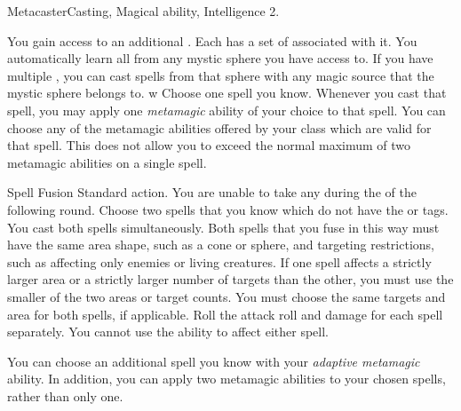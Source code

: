   \begin{magicalfeat}{Metacaster}{Casting, Magical}
    \featpre {} ability, Intelligence 2.

     You gain access to an additional .
    Each  has a set of  associated with it.
    You automatically learn all  from any mystic sphere you have access to.
    If you have multiple , you can cast spells from that sphere with any magic source that the mystic sphere belongs to.
    w
     Choose one spell you know.
    Whenever you cast that spell, you may apply one \textit{metamagic} ability of your choice to that spell.
    You can choose any of the metamagic abilities offered by your class which are valid for that spell.
    This does not allow you to exceed the normal maximum of two metamagic abilities on a single spell.

    \begin{magicalactiveability}{Spell Fusion}
      \abilityusagetime Standard action.
      \abilitycost You are unable to take any  during the  of the following round.
      \rankline
      Choose two spells that you know which do not have the  or  tags.
      You cast both spells simultaneously.
      Both spells that you fuse in this way must have the same area shape, such as a cone or sphere, and targeting restrictions, such as affecting only enemies or living creatures.
      If one spell affects a strictly larger area or a strictly larger number of targets than the other, you must use the smaller of the two areas or target counts.
      You must choose the same targets and area for both spells, if applicable.
      Roll the attack roll and damage for each spell separately.
      You cannot use the  ability to affect either spell.
    \end{magicalactiveability}

     You can choose an additional spell you know with your \textit{adaptive metamagic} ability.
    In addition, you can apply two metamagic abilities to your chosen spells, rather than only one.
  \end{magicalfeat}

